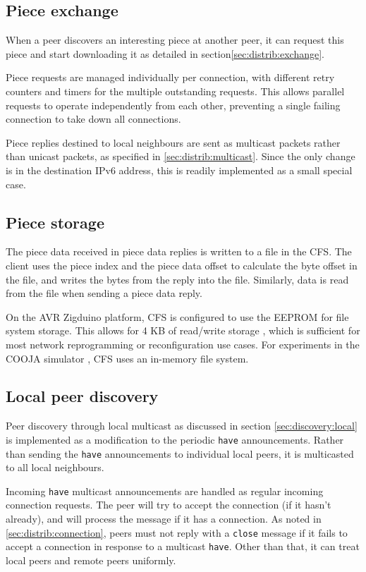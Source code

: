 \subsection{Piece exchange}
When a peer discovers an interesting piece at another peer, it can request this piece and start downloading it as detailed in section\ref{sec:distrib:exchange}.

Piece requests are managed individually per connection, with different retry counters and timers for the multiple outstanding requests. This allows parallel requests to operate independently from each other, preventing a single failing connection to take down all connections.

Piece replies destined to local neighbours are sent as multicast packets rather than unicast packets, as specified in \ref{sec:distrib:multicast}. Since the only change is in the destination \gls{IPv6} address, this is readily implemented as a small special case.

\subsection{Piece storage}
The piece data received in piece data replies is written to a file in the \acrfull{CFS}. The client uses the piece index and the piece data offset to calculate the byte offset in the file, and writes the bytes from the reply into the file. Similarly, data is read from the file when sending a piece data reply.

On the AVR Zigduino platform, \gls{CFS} is configured to use the \gls{EEPROM} for file system storage. This allows for 4 KB of read/write storage \cite{zigduino-manual}, which is sufficient for most network reprogramming or reconfiguration use cases. For experiments in the COOJA simulator \cite{cooja}, \gls{CFS} uses an in-memory file system.

\subsection{Local peer discovery}
Peer discovery through local multicast as discussed in section \ref{sec:discovery:local} is implemented as a modification to the periodic \texttt{have} announcements. Rather than sending the \texttt{have} announcements to individual local peers, it is multicasted to all local neighbours.

Incoming \texttt{have} multicast announcements are handled as regular incoming connection requests. The peer will try to accept the connection (if it hasn't already), and will process the message if it has a connection. As noted in \ref{sec:distrib:connection}, peers must not reply with a \texttt{close} message if it fails to accept a connection in response to a multicast \texttt{have}. Other than that, it can treat local peers and remote peers uniformly.

